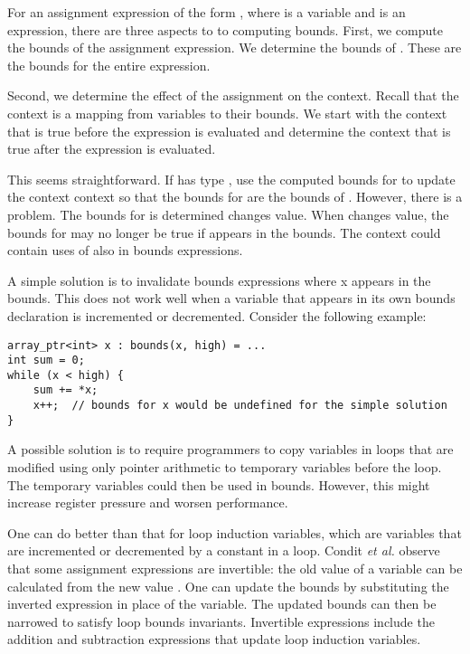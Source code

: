 For an assignment expression of the form  \code{=} ,
where  is a variable and  is an expression, there are
three aspects to to computing bounds.   First, we compute the bounds
of the assignment expression.  We determine the bounds of .  
These are the bounds for the entire expression.

Second, we determine the effect of the assignment on the context.
Recall that the context is a mapping from variables to their bounds.
We start with the context that is true before the expression
is evaluated and determine the context that is true after
the expression is evaluated.

This seems straightforward.  If  has type
\arrayptr, use the computed bounds for  to update the context
context so that the bounds for  are the bounds of .
However, there is a problem. The bounds for  is determined
  changes value. When  changes value, the bounds
for  may no longer be true if  appears in the bounds.
The context could contain uses of  also in bounds expressions.

A simple solution is to invalidate bounds expressions where x appears in
the bounds. This does not work well when a variable that appears in its
own bounds declaration is incremented or decremented. Consider the
following example:
\begin{lstlisting}
array_ptr<int> x : bounds(x, high) = ...
int sum = 0;
while (x < high) {
    sum += *x;
    x++;  // bounds for x would be undefined for the simple solution
}
\end{lstlisting}

A possible solution is to require programmers to copy variables in loops
that are modified using only pointer arithmetic to temporary variables
before the loop. The temporary variables could then be used in bounds.
However, this might increase register pressure and worsen performance.

One can do better than that for loop induction variables, which are
variables that are incremented or decremented by a constant in a loop.
Condit \textit{et al.} observe that some assignment expressions are
invertible: the old value of a variable can be calculated from the new
value . One can update the bounds by substituting the inverted
expression in place of the variable. The updated bounds can then be
narrowed to satisfy loop bounds invariants. Invertible expressions
include the addition and subtraction expressions that update loop
induction variables.

